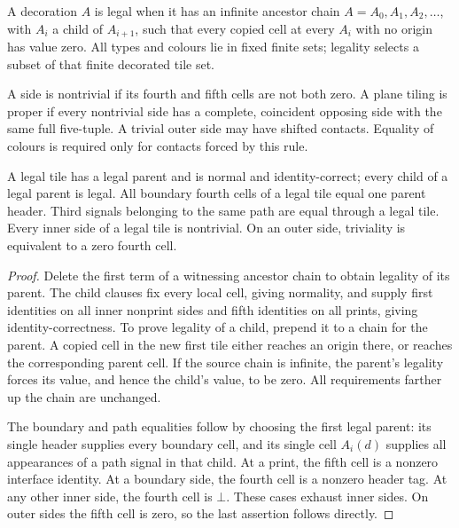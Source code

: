\begin{definition}
\label{def:control/legal}
A decoration $A$ is legal when it has an infinite ancestor chain
$A=A_0,A_1,A_2,\ldots$, with $A_i$ a child of $A_{i+1}$, such that every
copied cell at every $A_i$ with no origin has value zero. All types and
colours lie in fixed finite sets; legality selects a subset of that finite
decorated tile set.

A side is nontrivial if its fourth and fifth cells are not both zero.
A plane tiling is proper if every nontrivial side has a complete, coincident
opposing side with the same full five-tuple. A trivial outer side may have
shifted contacts. Equality of colours is required only for contacts forced
by this rule.
\end{definition}

\begin{lemma}
\label{lem:comp/legal-properties}
A legal tile has a legal parent and is normal and identity-correct;
every child of a legal parent
is legal. All boundary fourth cells of a legal tile equal one parent header.
Third signals belonging to the same path are equal through a legal tile.
Every inner side of a legal tile is nontrivial. On an outer side, triviality
is equivalent to a zero fourth cell.
\end{lemma}
\begin{proof}
Delete the first term of a witnessing ancestor chain to obtain legality of
its parent. The child clauses fix every local cell, giving normality, and
supply first identities on all inner nonprint sides and fifth identities
on all prints, giving identity-correctness.
To prove legality of a child, prepend it to a chain for the parent. A copied
cell in the new first tile either reaches an origin there, or reaches the
corresponding parent cell. If the source chain is infinite, the parent's
legality forces its value, and hence the child's value, to be zero. All
requirements farther up the chain are unchanged.

The boundary and path equalities follow by choosing the first legal parent:
its single header supplies every boundary cell, and its single cell $A_i(d)$
supplies all appearances of a path signal in that child. At a print, the
fifth cell is a nonzero interface identity. At a boundary side, the fourth cell
is a nonzero header tag. At any other inner side, the fourth cell is $\bot$.
These cases exhaust inner sides. On outer sides the fifth cell is zero,
so the last assertion follows directly.
\end{proof}


